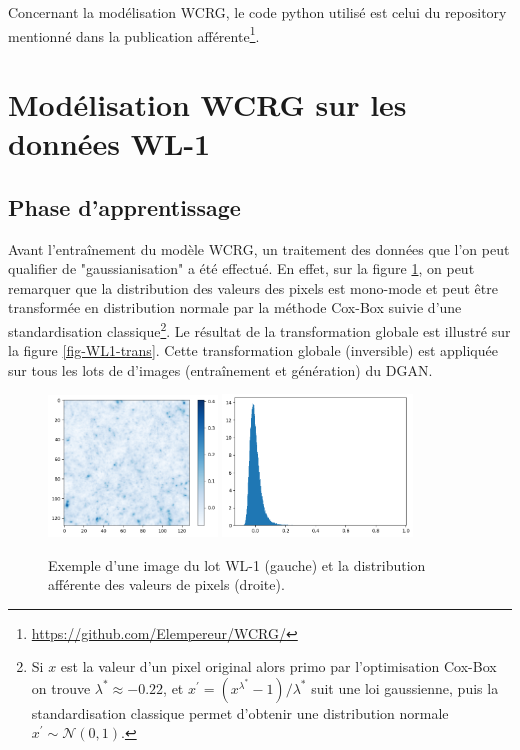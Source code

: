 \documentclass[12pt,twoside]{article}
\begin{document}
Concernant la modélisation WCRG, le code python utilisé est celui du repository mentionné dans la publication afférente\footnote{\url{https://github.com/Elempereur/WCRG/}}.
%
\section{Modélisation WCRG sur les données WL-1}
\label{sec:WL1}
%
\subsection{Phase d'apprentissage}
\label{sec-wcrg-WL1-learning}
%
Avant l'entraînement du modèle WCRG, un traitement des données que l'on peut qualifier de "gaussianisation" a été effectué. En effet, sur la figure \ref{fig-WL1-non-trans}, on peut remarquer que la distribution des valeurs des pixels est mono-mode et peut être transformée en distribution normale par la méthode Cox-Box suivie d'une standardisation classique\footnote{Si $x$ est la valeur d'un pixel original alors primo par l'optimisation Cox-Box on trouve $\lambda^\ast \approx -0.22$, et $x^\prime = (x^{\lambda^\ast}-1)/\lambda^\ast$ suit une loi gaussienne, puis la standardisation classique permet d'obtenir une distribution normale $x^\prime \sim \mathcal{N}(0,1)$.}. Le résultat de la transformation globale est illustré sur la figure \ref{fig-WL1-trans}. Cette transformation globale (inversible) est appliquée sur tous les lots de d'images (entraînement et génération) du DGAN.
%
\begin{figure}[h]
\centering
\includegraphics[width=0.4\textwidth]{fig-WL1-img-non-transformed.png}
\includegraphics[width=0.45\textwidth]{fig-WL1-pixelval-non-trans.png}
\caption{Exemple d'une image du lot WL-1 (gauche) et la distribution afférente des valeurs de pixels (droite).}
\label{fig-WL1-non-trans}
\end{figure}
\end{document}
